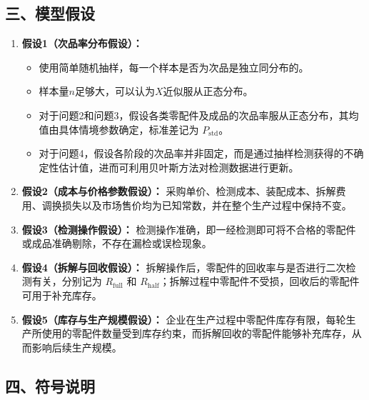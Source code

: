 \documentclass{article}
\begin{document}
	\begin{center}
		\section*{三、模型假设}
	\end{center}
	\begin{enumerate}
		\item \textbf{假设1（次品率分布假设）：} 
		\begin{itemize}
			\item 使用简单随机抽样，每一个样本是否为次品是独立同分布的。
			\item 样本量$n$足够大，可以认为$X$近似服从正态分布。
			\item 对于问题2和问题3，假设各类零配件及成品的次品率服从正态分布，其均值由具体情境参数确定，标准差记为 $P_{\text{std}}$。
			\item 对于问题4，假设各阶段的次品率并非固定，而是通过抽样检测获得的不确定性估计值，进而可利用贝叶斯方法对检测数据进行更新。
		\end{itemize}
		
		\item \textbf{假设2（成本与价格参数假设）：}  
		采购单价、检测成本、装配成本、拆解费用、调换损失以及市场售价均为已知常数，并在整个生产过程中保持不变。
		
		\item \textbf{假设3（检测操作假设）：}  
		检测操作准确，即一经检测即可将不合格的零配件或成品准确剔除，不存在漏检或误检现象。
		
		\item \textbf{假设4（拆解与回收假设）：}  
		拆解操作后，零配件的回收率与是否进行二次检测有关，分别记为 $R_{\text{full}}$ 和 $R_{\text{half}}$；拆解过程中零配件不受损，回收后的零配件可用于补充库存。
		
		\item \textbf{假设5（库存与生产规模假设）：}  
		企业在生产过程中零配件库存有限，每轮生产所使用的零配件数量受到库存约束，而拆解回收的零配件能够补充库存，从而影响后续生产规模。
		
	\end{enumerate}
	
	\begin{center}
		\section*{四、符号说明}
	\end{center}
	
\end{document}
